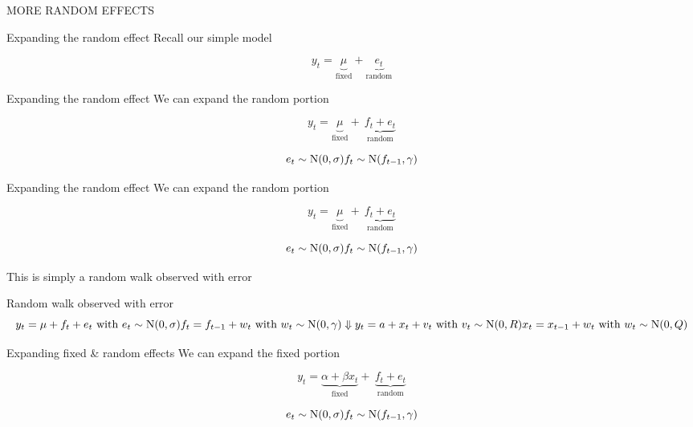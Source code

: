 \documentclass[
  ignorenonframetext,
]{beamer}
\begin{document}
\begin{frame}{}
\protect\hypertarget{section}{}
MORE RANDOM EFFECTS
\end{frame}

\begin{frame}{Expanding the random effect}
\protect\hypertarget{expanding-the-random-effect}{}
Recall our simple model

\[
y_t = \underbrace{\mu}_{\text{fixed}} + \underbrace{e_t}_{\text{random}}
\]
\end{frame}

\begin{frame}{Expanding the random effect}
\protect\hypertarget{expanding-the-random-effect-1}{}
We can expand the random portion

\[
y_t = \underbrace{\mu}_{\text{fixed}} + ~ \underbrace{f_t + e_t}_{\text{random}}
\]

\[
e_t \sim \text{N}(0, \sigma) \\
f_t \sim \text{N}(f_{t-1}, \gamma)
\]
\end{frame}

\begin{frame}{Expanding the random effect}
\protect\hypertarget{expanding-the-random-effect-2}{}
We can expand the random portion

\[
y_t = \underbrace{\mu}_{\text{fixed}} + ~ \underbrace{f_t + e_t}_{\text{random}}
\]

\[
e_t \sim \text{N}(0, \sigma) \\
f_t \sim \text{N}(f_{t-1}, \gamma)
\]

This is simply a random walk observed with error
\end{frame}

\begin{frame}{Random walk observed with error}
\protect\hypertarget{random-walk-observed-with-error}{}
\[
y_t = \mu + f_t + e_t ~ \text{with} ~ e_t \sim \text{N}(0, \sigma) \\
f_t = f_{t-1} + w_t ~ \text{with} ~ w_t \sim \text{N}(0, \gamma) \\
\Downarrow \\
y_t = a + x_t + v_t ~ \text{with} ~ v_t \sim \text{N}(0, R) \\
x_t = x_{t-1} + w_t ~ \text{with} ~ w_t \sim \text{N}(0, Q)
\]
\end{frame}

\begin{frame}{Expanding fixed \& random effects}
\protect\hypertarget{expanding-fixed-random-effects}{}
We can expand the fixed portion

\[
y_t = \underbrace{\alpha + \beta x_t}_{\text{fixed}} + ~ \underbrace{f_t + e_t}_{\text{random}}
\]

\[
e_t \sim \text{N}(0, \sigma) \\
f_t \sim \text{N}(f_{t-1}, \gamma)
\]
\end{frame}
\end{document}
